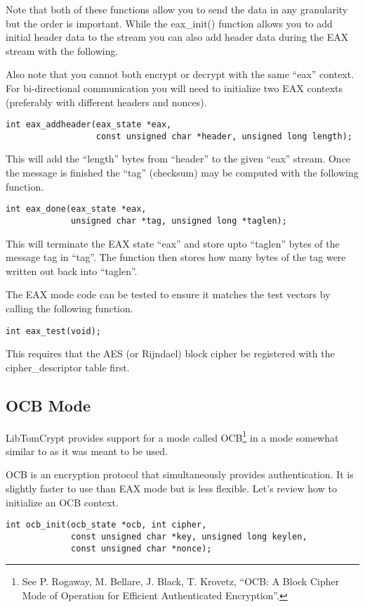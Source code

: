 \documentclass[b5paper]{book}
\begin{document}
Note that both of these functions allow you to send the data in any granularity but the order is important.  While
the eax\_init() function allows you to add initial header data to the stream you can also add header data during the
EAX stream with the following.

Also note that you cannot both encrypt or decrypt with the same ``eax'' context.  For bi-directional communication you
will need to initialize two EAX contexts (preferably with different headers and nonces).  

\begin{verbatim}
int eax_addheader(eax_state *eax, 
                  const unsigned char *header, unsigned long length);
\end{verbatim}

This will add the ``length'' bytes from ``header'' to the given ``eax'' stream.  Once the message is finished the 
``tag'' (checksum) may be computed with the following function.

\begin{verbatim}
int eax_done(eax_state *eax, 
             unsigned char *tag, unsigned long *taglen);
\end{verbatim}
This will terminate the EAX state ``eax'' and store upto ``taglen'' bytes of the message tag in ``tag''.  The function
then stores how many bytes of the tag were written out back into ``taglen''.

The EAX mode code can be tested to ensure it matches the test vectors by calling the following function.
\begin{verbatim}
int eax_test(void);
\end{verbatim}
This requires that the AES (or Rijndael) block cipher be registered with the cipher\_descriptor table first.

\subsection{OCB Mode}
LibTomCrypt provides support for a mode called OCB\footnote{See 
P. Rogaway, M. Bellare, J. Black, T. Krovetz, ``OCB: A Block Cipher Mode of Operation for Efficient Authenticated Encryption''.}
in a mode somewhat similar to as it was meant to be used.

OCB is an encryption protocol that simultaneously provides authentication.  It is slightly faster to use than EAX mode
but is less flexible.  Let's review how to initialize an OCB context.

\begin{verbatim}
int ocb_init(ocb_state *ocb, int cipher, 
             const unsigned char *key, unsigned long keylen, 
             const unsigned char *nonce);
\end{verbatim}
\end{document}

